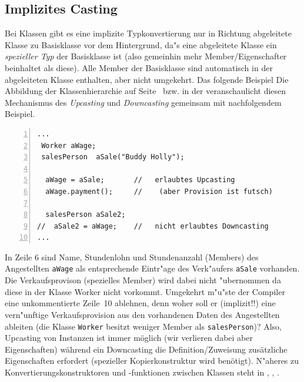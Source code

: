 \subsection{Implizites Casting}
\label{sec:A4.1}
%
Bei Klassen gibt es eine implizite Typkonvertierung nur in
Richtung abgeleitete Klasse zu Basisklasse vor dem Hintergrund, da"s
eine abgeleitete Klasse ein \emph{spezieller Typ} der Basisklasse ist
(also gemeinhin mehr Member/Eigenschafter beinhaltet als diese).
Alle Member der Basisklasse sind automatisch in der abgeleiteten Klasse enthalten, aber nicht umgekehrt.
Das folgende Beispiel 
Die Abbildung der Klassenhierarchie auf Seite~\pageref{class_hierarchy} bzw. in der 
veranschaulicht diesen Mechanismus des \emph{Upcasting} und \emph{Downcasting} gemeinsam mit nachfolgendem Beispiel.

\begin{lstlisting}[caption={Casting bei Klassen.},label=lst:casting_klassen_1,
basicstyle=\scriptsize,numbers=left, numberstyle=\tiny, stepnumber=2, numbersep=5pt]
...
 Worker aWage;
 salesPerson  aSale("Buddy Holly");

  aWage = aSale;       //   erlaubtes Upcasting
  aWage.payment();     //    (aber Provision ist futsch)

  salesPerson aSale2;
//  aSale2 = aWage;    //   nicht erlaubtes Downcasting
...
\end{lstlisting}
%
In Zeile 6 sind Name, Stundenlohn und Stundenanzahl (Members) des Angestellten \texttt{aWage}
als entsprechende Eintr"age des Verk"aufers \texttt{aSale} vorhanden.
Die Verkaufsprovison (spezielles Member) wird dabei nicht "ubernommen da diese in der Klasse Worker nicht vorkommt.
Umgekehrt m"u"ste der Compiler eine unkommentierte Zeile~10 ablehnen, denn
woher soll er (implizit!!) eine vern"unftige Verkaufsprovision aus den
vorhandenen Daten des Angestellten ableiten
(die Klasse \texttt{Worker} besitzt weniger Member  als \texttt{salesPerson})?
Also, Upcasting von Instanzen ist immer möglich (wir verlieren dabei aber Eigenschaften) während 
ein Downcasting die Definition/Zuweisung zusätzliche Eigenschaften erfordert (spezieller Kopierkonstruktur wird benötigt). 
N"aheres zu Konvertierungskonstruktoren und -funktionen zwischen Klassen steht in
\cite[\S9 und \S19]{KirchPrinz:2002:OOP},
\cite[\S9.4.4]{Schmaranz:2002:SCP},
\cite[\S16.5]{SchaderKuhlins:1998:PCP}. 
%
%
